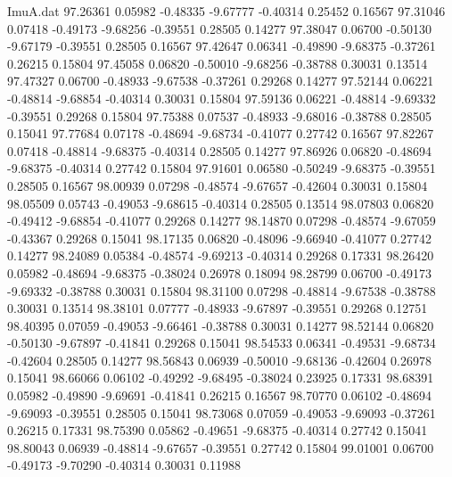 \begin{filecontents}{ImuA.dat}
  97.26361    0.05982   -0.48335   -9.67777   -0.40314    0.25452    0.16567
  97.31046    0.07418   -0.49173   -9.68256   -0.39551    0.28505    0.14277
  97.38047    0.06700   -0.50130   -9.67179   -0.39551    0.28505    0.16567
  97.42647    0.06341   -0.49890   -9.68375   -0.37261    0.26215    0.15804
  97.45058    0.06820   -0.50010   -9.68256   -0.38788    0.30031    0.13514
  97.47327    0.06700   -0.48933   -9.67538   -0.37261    0.29268    0.14277
  97.52144    0.06221   -0.48814   -9.68854   -0.40314    0.30031    0.15804
  97.59136    0.06221   -0.48814   -9.69332   -0.39551    0.29268    0.15804
  97.75388    0.07537   -0.48933   -9.68016   -0.38788    0.28505    0.15041
  97.77684    0.07178   -0.48694   -9.68734   -0.41077    0.27742    0.16567
  97.82267    0.07418   -0.48814   -9.68375   -0.40314    0.28505    0.14277
  97.86926    0.06820   -0.48694   -9.68375   -0.40314    0.27742    0.15804
  97.91601    0.06580   -0.50249   -9.68375   -0.39551    0.28505    0.16567
  98.00939    0.07298   -0.48574   -9.67657   -0.42604    0.30031    0.15804
  98.05509    0.05743   -0.49053   -9.68615   -0.40314    0.28505    0.13514
  98.07803    0.06820   -0.49412   -9.68854   -0.41077    0.29268    0.14277
  98.14870    0.07298   -0.48574   -9.67059   -0.43367    0.29268    0.15041
  98.17135    0.06820   -0.48096   -9.66940   -0.41077    0.27742    0.14277
  98.24089    0.05384   -0.48574   -9.69213   -0.40314    0.29268    0.17331
  98.26420    0.05982   -0.48694   -9.68375   -0.38024    0.26978    0.18094
  98.28799    0.06700   -0.49173   -9.69332   -0.38788    0.30031    0.15804
  98.31100    0.07298   -0.48814   -9.67538   -0.38788    0.30031    0.13514
  98.38101    0.07777   -0.48933   -9.67897   -0.39551    0.29268    0.12751
  98.40395    0.07059   -0.49053   -9.66461   -0.38788    0.30031    0.14277
  98.52144    0.06820   -0.50130   -9.67897   -0.41841    0.29268    0.15041
  98.54533    0.06341   -0.49531   -9.68734   -0.42604    0.28505    0.14277
  98.56843    0.06939   -0.50010   -9.68136   -0.42604    0.26978    0.15041
  98.66066    0.06102   -0.49292   -9.68495   -0.38024    0.23925    0.17331
  98.68391    0.05982   -0.49890   -9.69691   -0.41841    0.26215    0.16567
  98.70770    0.06102   -0.48694   -9.69093   -0.39551    0.28505    0.15041
  98.73068    0.07059   -0.49053   -9.69093   -0.37261    0.26215    0.17331
  98.75390    0.05862   -0.49651   -9.68375   -0.40314    0.27742    0.15041
  98.80043    0.06939   -0.48814   -9.67657   -0.39551    0.27742    0.15804
  99.01001    0.06700   -0.49173   -9.70290   -0.40314    0.30031    0.11988

\end{filecontents}
